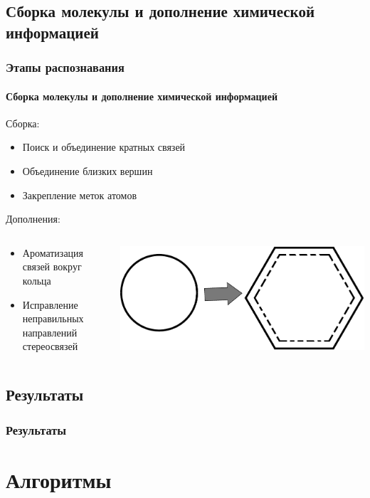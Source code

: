 \subsection{Сборка молекулы и дополнение химической информацией}

\begin{frame}
  \frametitle{Этапы распознавания}
  \framesubtitle{Сборка молекулы и дополнение химической информацией}
  Сборка:
  \begin{itemize}
    \item Поиск и объединение кратных связей
    \item Объединение близких вершин
    \item Закрепление меток атомов
  \end{itemize}
  Дополнения:
  \begin{columns}
    \begin{column}{0.5\textwidth}
  \begin{itemize}
    \item Ароматизация связей вокруг кольца
    \item Исправление неправильных направлений стереосвязей
  \end{itemize}
\end{column}
\begin{column}{0.5\textwidth}
    \includegraphics[scale=0.3]{media/aromatic.pdf}
\end{column}
\end{columns}
\end{frame}

\subsection{Результаты}

\begin{frame}
  \frametitle{Результаты}
\end{frame}

\section{Алгоритмы}


